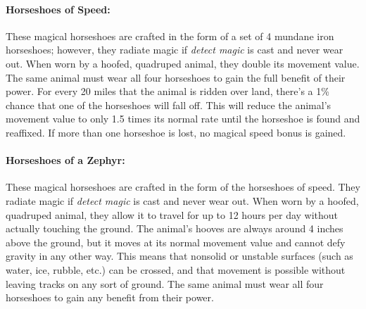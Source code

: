 \begin{multicols}{2}
\paragraph{Horseshoes of Speed:} These magical horseshoes are crafted in the form of a set of 4 mundane iron horseshoes; however, they radiate magic if \textit{detect magic} is cast and never wear out.  When worn by a hoofed, quadruped animal, they double its movement value.  The same animal must wear all four horseshoes to gain the full benefit of their power.  For every 20 miles that the animal is ridden over land, there's a 1\% chance that one of the horseshoes will fall off.  This will reduce the animal's movement value to only 1.5 times its normal rate until the horseshoe is found and reaffixed.  If more than one horseshoe is lost, no magical speed bonus is gained.

\paragraph{Horseshoes of a Zephyr:} These magical horseshoes are crafted in the form of the horseshoes of speed.  They radiate magic if \textit{detect magic} is cast and never wear out.  When worn by a hoofed, quadruped animal, they allow it to travel for up to 12 hours per day without actually touching the ground.  The animal's hooves are always around 4 inches above the ground, but it moves at its normal movement value and cannot defy gravity in any other way.  This means that nonsolid or unstable surfaces (such as water, ice, rubble, etc.) can be crossed, and that movement is possible without leaving tracks on any sort of ground.  The same animal must wear all four horseshoes to gain any benefit from their power.


\end{multicols}
